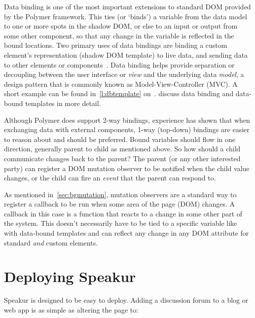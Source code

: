 Data binding is one of the most important extensions to standard DOM provided by the Polymer framework. 
This ties (or `binds') a variable from the data model to one or more spots in the shadow DOM, or else to an input or output from some other component, 
so that any change in the variable is reflected in the bound locations.
Two primary uses of data bindings are
binding a custom element's representation (shadow DOM template) to live data, 
and sending data to other elements or components~\cite{polymercontributors2015-b}. 
Data binding helps provide separation or decoupling between the user interface or \textit{view} and the underlying data \textit{model}, 
a design pattern that is commonly known as 
Model-View-Controller (MVC).
A short example can be found in~\cref{l:dbtemplate} on~.
 discuss data binding and data-bound templates in more detail.

Although Polymer does support 2-way bindings, 
experience has shown that when exchanging data with external components, 1-way (top-down) bindings are easier to reason about and should be preferred.
Bound variables should flow in one direction, generally parent to child as mentioned above.
So how should a child communicate changes back to the parent? 
The parent (or any other interested party) can register a DOM mutation observer to be notified when the child value changes, or the child can fire an \textit{event} that the parent can respond to.

As mentioned in~\cref{sec:bgmutation}, 
mutation observers are a standard way to register a callback to be run when some area of the page (DOM) changes. 
A callback in this case is a function that reacts to a change in some other part of the system.
This doesn't necessarily have to be tied to a specific variable like with data-bound templates and can reflect any change in any DOM attribute for standard \textit{and} custom elements. 

\section{Deploying Speakur}
\label{sec:deploying}
Speakur is designed to be easy to deploy.
Adding a discussion forum to a blog or web app is as simple as altering the page to:

